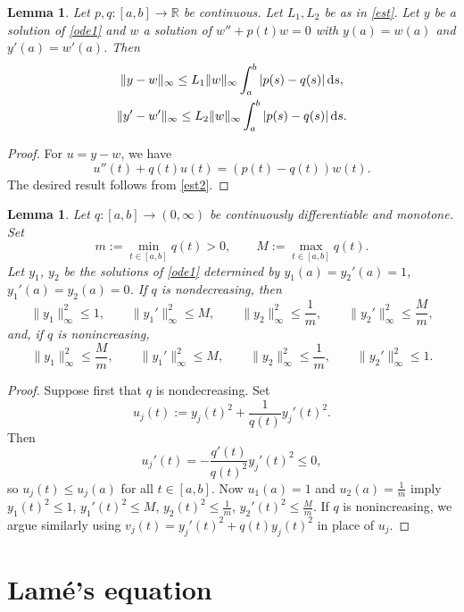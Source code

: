 \documentclass[pdftex]{sigma}
\newcommand{\R}{\mathbb{R}}
\numberwithin{equation}{section}
\newtheorem{Lemma}[Theorem]{Lemma}
\begin{document}
\begin{Lemma}\label{l1}
Let $p,q\colon [a,b]\to \R$ be continuous. Let $L_1, L_2$ be as in \eqref{est}.
Let $y$ be a solution of \eqref{ode1} and $w$ a solution of $w''+p(t) w=0$ with $y(a)=w(a)$ and $y'(a)=w'(a)$.
Then
\begin{gather*}
 \|y-w\|_\infty \le L_1 \|w\|_\infty \int_a^b|p(s)-q(s)|\,{\rm d}s,\\
 \|y'-w'\|_\infty \le L_2 \|w\|_\infty \int_a^b|p(s)-q(s)|\,{\rm d}s.
\end{gather*}
\end{Lemma}
\begin{proof}
For $u=y-w$, we have
\[ u''(t)+q(t) u(t)=(p(t)-q(t))w(t) .\]
The desired result follows from \eqref{est2}.
\end{proof}

\begin{Lemma}\label{l2}
Let $q\colon [a,b]\to(0,\infty)$ be continuously differentiable and monotone. Set
 \[ m:=\min_{t\in[a,b]} q(t)>0,\qquad M:=\max_{t\in[a,b]} q(t).\]
Let $y_1$, $y_2$ be the solutions of \eqref{ode1} determined by $y_1(a)=y_2'(a)=1$, $y_1'(a)=y_2(a)=0$.
If $q$ is nondecreasing, then
\[ \|y_1\|^2_\infty\le 1,\qquad
 \|y_1'\|_\infty^2\le M,\qquad \|y_2\|_\infty^2\le \frac{1}{m}, \qquad \|y_2'\|_\infty^2\le \frac{M}{m},
\]
and, if $q$ is nonincreasing,
\[ \|y_1\|^2_\infty\le \frac{M}{m},\qquad
 \|y_1'\|_\infty^2\le M,\qquad \|y_2\|_\infty^2\le \frac{1}{m}, \qquad \|y_2'\|_\infty^2\le 1.
\]
\end{Lemma}
\begin{proof}
Suppose first that $q$ is nondecreasing. Set
\[ u_j(t):=y_j(t)^2+\frac{1}{q(t)}y_j'(t)^2 .\]
Then
\[ u_j'(t)=-\frac{q'(t)}{q(t)^2}y_j'(t)^2\le 0,\]
so $u_j(t)\le u_j(a)$ for all $t\in[a,b]$. Now $u_1(a)=1$ and $u_2(a)=\frac1m$ imply $y_1(t)^2\le 1$,
$y_1'(t)^2\le M$, $y_2(t)^2\le \frac1m$, $y_2'(t)^2\le \frac{M}{m}$.
If $q$ is nonincreasing, we argue similarly using $v_j(t)=y_j'(t)^2+q(t)y_j(t)^2$ in place of $u_j$.
\end{proof}

\section{Lam\'e's equation}\label{Lame1}
\end{document}
